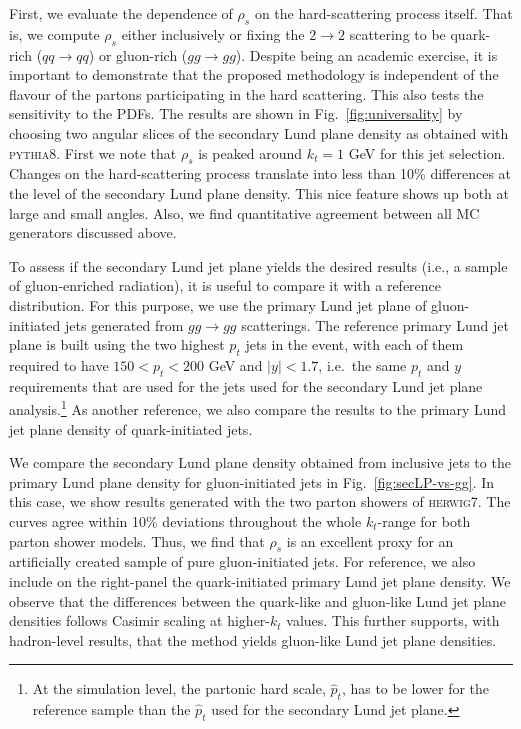 \documentclass[a4paper,11pt]{article}
\newcommand{\py}{{\textsc{pythia}}8\xspace}
\newcommand{\hw}{{\textsc{herwig}}7\xspace}
\begin{document}
First, we evaluate the dependence of $\rho_s$ on the hard-scattering process itself. That is, we compute $\rho_s$ either inclusively or fixing the $2\to 2$ scattering to be quark-rich ($qq\to qq$) or gluon-rich ($gg\to gg$). Despite being an academic exercise, it is important to demonstrate that the proposed methodology is independent of the flavour of the partons participating in the hard scattering. This also tests the sensitivity to the PDFs. The results are shown in Fig.~\ref{fig:universality} by choosing two angular slices of the secondary Lund plane density as obtained with \py. First we note that $\rho_s$ is peaked around $k_t=1$ GeV for this jet selection. Changes on the hard-scattering process translate into less than 10\% differences at the level of the secondary Lund plane density. This nice feature shows up both at large and small angles. Also, we find quantitative agreement between all MC generators discussed above.    

To assess if the secondary Lund jet plane yields the desired results (i.e., a sample of gluon-enriched radiation), it is useful to compare it with a reference distribution. For this purpose, we use the primary Lund jet plane of gluon-initiated jets generated from $gg\to gg$ scatterings. The reference primary Lund jet plane is built using the two highest $p_t$ jets in the event, with each of them required to have $150 < p_{t} < 200$ GeV and $|y| < 1.7$, i.e.\ the same $p_t$ and $y$ requirements that are used for the jets used for the secondary Lund jet plane analysis.\footnote{At the simulation level, the partonic hard scale, $\hat{p}_t$, has to be lower for the reference sample than the $\hat{p}_t$ used for the secondary Lund jet plane.} As another reference, we also compare the results to the primary Lund jet plane density of quark-initiated jets.

We compare the secondary Lund plane density obtained from inclusive jets to the primary Lund plane density for gluon-initiated jets in Fig.~\ref{fig:secLP-vs-gg}. In this case, we show results generated with the two parton showers of \hw. The curves agree within 10\% deviations throughout the whole $k_t$-range for both parton shower models. Thus, we find that $\rho_s$ is an excellent proxy for an artificially created sample of pure gluon-initiated jets. For reference, we also include on the right-panel the quark-initiated primary Lund jet plane density. We observe that the differences between the quark-like and gluon-like Lund jet plane densities follows Casimir scaling at higher-$k_t$ values. This further supports, with hadron-level results, that the method yields gluon-like Lund jet plane densities.
\end{document}

